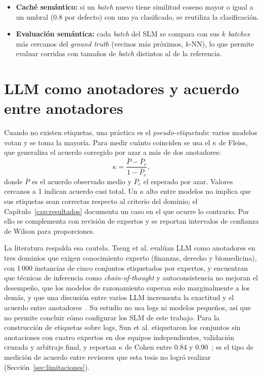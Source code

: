 \begin{itemize}
  \item \textbf{Caché semántico:} si un \textit{batch} nuevo tiene similitud coseno mayor o igual a un umbral (0.8 por defecto) con uno ya clasificado, se reutiliza la clasificación.
  \item \textbf{Evaluación semántica:} cada \textit{batch} del SLM se compara con sus $k$ \textit{batches} más cercanos del \textit{ground truth} (vecinos más próximos, $k$-NN), lo que permite evaluar corridas con tamaños de \textit{batch} distintos al de la referencia.
\end{itemize}

\section{LLM como anotadores y acuerdo entre anotadores}\label{sec:mt_anotacion}

Cuando no existen etiquetas, una práctica es el \textit{pseudo-etiquetado}: varios modelos votan y se toma la mayoría. Para medir cuánto coinciden se usa el $\kappa$ de Fleiss, que generaliza el acuerdo corregido por azar a más de dos anotadores:
\begin{equation}
\kappa = \frac{\bar{P} - \bar{P}_e}{1 - \bar{P}_e},
\end{equation}
donde $\bar{P}$ es el acuerdo observado medio y $\bar{P}_e$ el esperado por azar. Valores cercanos a 1 indican acuerdo casi total. %
Un $\kappa$ alto entre modelos no implica que sus etiquetas sean correctas respecto al criterio del dominio; el Capítulo~\ref{cap:resultados} documenta un caso en el que ocurre lo contrario. Por ello se complementa con revisión de expertos y se reportan intervalos de confianza de Wilson para proporciones.

La literatura respalda esa cautela. Tseng et al. evalúan LLM como anotadores en tres dominios que exigen conocimiento experto (finanzas, derecho y biomedicina), con 1\,000 instancias de cinco conjuntos etiquetados por expertos, y encuentran que técnicas de inferencia como \textit{chain-of-thought} y autoconsistencia no mejoran el desempeño, que los modelos de razonamiento superan solo marginalmente a los demás, y que una discusión entre varios LLM incrementa la exactitud y el acuerdo entre anotadores~\cite{tseng2025_expert_annotators}. Su estudio no usa logs ni modelos pequeños, así que no permite concluir cómo configurar los SLM de este trabajo. Para la construcción de etiquetas sobre logs, Sun et al. etiquetaron los conjuntos sin anotaciones con cuatro expertos en dos equipos independientes, validación cruzada y arbitraje final, y reportan $\kappa$ de Cohen entre 0.84 y 0.90~\cite{sun2026_parsing}; es el tipo de medición de acuerdo entre revisores que esta tesis no logró realizar (Sección~\ref{sec:limitaciones}).

